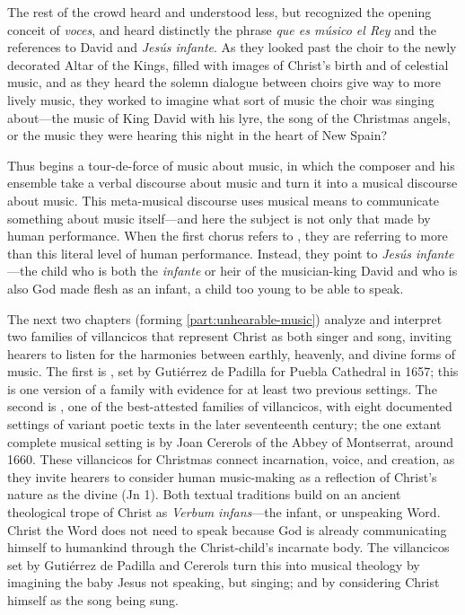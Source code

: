 The rest of the crowd heard and understood less, but recognized the opening
conceit of \emph{voces}, and heard distinctly the phrase \emph{que es músico el
Rey} and the references to David and \emph{Jesús infante}.
As they looked past the choir to the newly decorated Altar of the Kings, filled
with images of Christ's birth and of celestial music, and as they heard the
solemn dialogue between choirs give way to more lively music, they worked to
imagine what sort of music the choir was singing about---the music of King
David with his lyre, the song of the Christmas angels, or the music they were
hearing this night in the heart of New Spain?

Thus begins a tour-de-force of music about music, in which the composer and his
ensemble take a verbal discourse about music and turn it into a musical
discourse about music.
This meta-musical discourse uses musical means to communicate something about
music itself---and here the subject is not only that made by human performance.
When the first chorus refers to , they are referring to
more than this literal level of human performance.
Instead, they point to \emph{Jesús infante}---the child who is both the
\emph{infante} or heir of the musician-king David and who is also God made
flesh as an infant, a child too young to be able to speak.

The next two chapters (forming \cref{part:unhearable-music}) analyze and
interpret two families of villancicos that represent Christ as both singer and
song, inviting hearers to listen for the harmonies between earthly, heavenly,
and divine forms of music.
The first is , set by Gutiérrez de Padilla
for Puebla Cathedral in 1657; this is one version of a family with evidence for
at least two previous settings.
The second is , one of the
best-attested families of villancicos, with eight documented settings of variant
poetic texts in the later seventeenth century; the one extant complete musical
setting is by Joan Cererols of the Abbey of Montserrat, around 1660.
These villancicos for Christmas connect incarnation, voice, and creation, as
they invite hearers to consider human music-making as a reflection of
Christ's nature as the divine  (Jn 1).
Both textual traditions build on an ancient theological trope of Christ as
\emph{Verbum infans}---the infant, or unspeaking Word.
Christ the Word does not need to speak because God is already communicating
himself to humankind through the Christ-child's incarnate body.
The villancicos set by Gutiérrez de Padilla and Cererols turn this into musical
theology by imagining the baby Jesus not speaking, but singing; and by
considering Christ himself as the song being sung.

